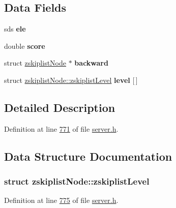 \subsection*{Data Fields}
\begin{DoxyCompactItemize}
\item 
\mbox{\label{structzskiplistNode_a3c96adcae9728744d54851c1a9fdc0b0}} 
sds {\bfseries ele}
\item 
\mbox{\label{structzskiplistNode_a2e1fccfc9c9b17d179ee36259e230104}} 
double {\bfseries score}
\item 
\mbox{\label{structzskiplistNode_a265aacf3a74993081652f73e66a16c8a}} 
struct \hyperlink{structzskiplistNode}{zskiplist\+Node} $\ast$ {\bfseries backward}
\item 
\mbox{\label{structzskiplistNode_abdd02b955494f3a036cd67c3df3becc6}} 
struct \hyperlink{structzskiplistNode_structzskiplistNode_1_1zskiplistLevel}{zskiplist\+Node\+::zskiplist\+Level} {\bfseries level} \mbox{[}$\,$\mbox{]}
\end{DoxyCompactItemize}


\subsection{Detailed Description}


Definition at line \hyperlink{server_8h_source_l00771}{771} of file \hyperlink{server_8h_source}{server.\+h}.



\subsection{Data Structure Documentation}
\label{structzskiplistNode_1_1zskiplistLevel}
\subsubsection{struct zskiplist\+Node\+:\+:zskiplist\+Level}


Definition at line \hyperlink{server_8h_source_l00775}{775} of file \hyperlink{server_8h_source}{server.\+h}.



